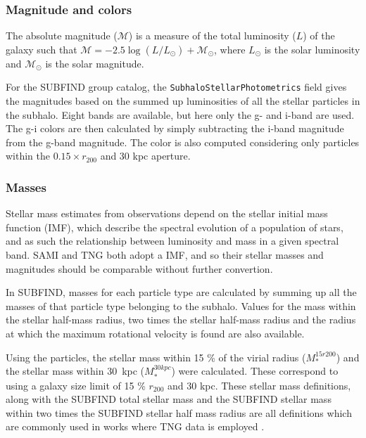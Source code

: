 \subsubsection{Magnitude and colors}

The absolute magnitude ($\mathcal{M}$) is a measure of the total luminosity ($L$) of the galaxy such that $\mathcal{M} = -2.5 \log(L/L_\odot) + \mathcal{M}_\odot$, where $L_\odot$ is the solar luminosity and $\mathcal{M}_\odot$ is the solar magnitude.

For the SUBFIND group catalog, the \texttt{SubhaloStellarPhotometrics} field gives the magnitudes based on the summed up luminosities of all the stellar particles in the subhalo. Eight bands are available, but here only the g- and i-band are used. The g-i colors are then calculated by simply subtracting the i-band magnitude from the g-band magnitude. The color is also computed considering only particles within the $0.15 \times r_{200}$ and 30 kpc aperture.

\subsubsection{Masses}

Stellar mass estimates from observations depend on the stellar initial mass function (IMF), which describe the spectral evolution of a population of stars, and as such the relationship between luminosity and mass in a given spectral band. SAMI and TNG both adopt a \textcite{Chabrier2003} IMF, and so their stellar masses and magnitudes should be comparable without further convertion.

In SUBFIND, masses for each particle type are calculated by summing up all the masses of that particle type belonging to the subhalo. Values for the mass within the stellar half-mass radius, two times the stellar half-mass radius and the radius at which the maximum rotational velocity is found are also available.

Using the particles, the stellar mass within 15 \% of the virial radius ($M_\ast^{15r200}$) and the stellar mass within 30$\,$ kpc ($M_\ast^{30kpc}$) were calculated. These correspond to using a galaxy size limit of 15 \% $r_{200}$ and 30 kpc. These stellar mass definitions, along with the SUBFIND total stellar mass and the SUBFIND stellar mass within two times the SUBFIND stellar half mass radius are all definitions which are commonly used in works where TNG data is employed \parencite[see e.g.,][]{Vazquez2020, Ferrero2020, Lu2020, Rodriguez2020}.

